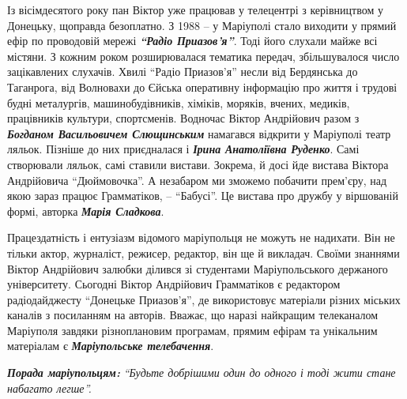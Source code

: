 
Із вісімдесятого року пан Віктор уже працював у телецентрі з керівництвом у
Донецьку, щоправда безоплатно. З 1988 – у Маріуполі стало виходити у прямий
ефір по проводовій мережі \emph{\textbf{\enquote{Радіо Приазов'я}}}. Тоді його слухали майже всі
містяни. З кожним роком розширювалася тематика передач, збільшувалося число
зацікавлених слухачів. Хвилі \enquote{Радіо Приазов'я} несли від Бердянська до
Таганрога, від Волновахи до Єйська оперативну інформацію про життя і трудові
будні металургів, машинобудівників, хіміків, моряків, вчених, медиків,
працівників культури, спортсменів. Водночас Віктор Андрійович разом з \emph{\textbf{Богданом
Васильовичем Слющинським}} намагався відкрити у Маріуполі театр ляльок. Пізніше
до них приєдналася і \emph{\textbf{Ірина Анатоліївна Руденко}}. Самі створювали ляльок, самі
ставили вистави. Зокрема, й досі йде вистава Віктора Андрійовича \enquote{Дюймовочка}.
А незабаром ми зможемо побачити прем'єру, над якою зараз працює Грамматіков, –
\enquote{Бабусі}. Це вистава про дружбу у віршованій формі, авторка \emph{\textbf{Марія Сладкова}}.


Працездатність і ентузіазм відомого маріупольця не можуть не надихати. Він не
тільки актор, журналіст, режисер, редактор, він ще й викладач. Своїми знаннями
Віктор Андрійович залюбки ділився зі студентами Маріупольського держаного
університету. Сьогодні Віктор Андрійович Грамматіков є редактором
радіодайджесту \enquote{Донецьке Приазов'я}, де використовує матеріали різних міських
каналів з посиланням на авторів. Вважає, що наразі найкращим телеканалом
Маріуполя завдяки різноплановим програмам, прямим ефірам та унікальним
матеріалам є \emph{\textbf{Маріупольське телебачення}}. 

\emph{\textbf{Порада маріупольцям:}} \emph{\enquote{Будьте добрішими один до одного і тоді жити стане набагато легше}.}
